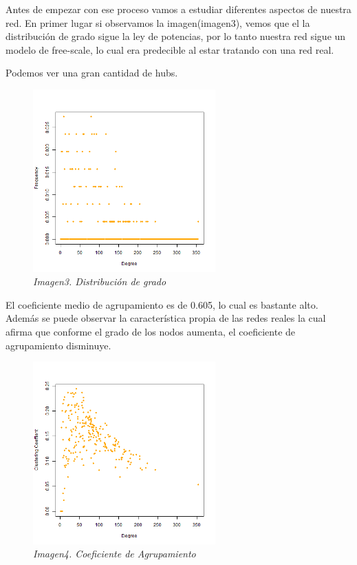 Antes de empezar con ese proceso vamos a estudiar diferentes aspectos de nuestra red. En primer lugar si observamos la imagen(imagen3), vemos que el la distribución de grado sigue la ley de potencias, por lo tanto nuestra red sigue un modelo de free-scale, lo cual era predecible al estar tratando con una red real. 

Podemos  ver una gran cantidad de hubs. 
\begin{figure}
	\centering
	
		\includegraphics[width=70mm,scale=1.2]{figures/degree_distribution.png}
		
		\caption{\textit{Imagen3. Distribución de grado}}
		
\end{figure}

El coeficiente medio de agrupamiento es de 0.605, lo cual es bastante alto. Además se puede observar la característica propia de las redes reales la cual afirma que conforme el grado de los nodos aumenta, el coeficiente de agrupamiento disminuye. 

\begin{figure}
	\centering
	
	\includegraphics[width=70mm,scale=1.2]{figures/coeficiente_agrupamiento.png}
	
	\caption{\textit{Imagen4. Coeficiente de Agrupamiento}}
	
\end{figure}


